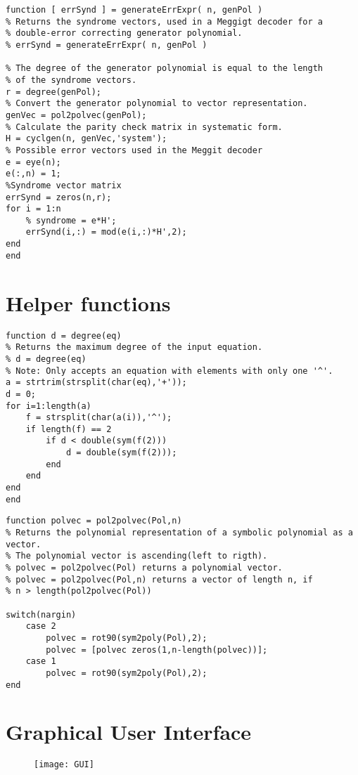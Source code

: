 \documentclass[MiniProjectMain]{subfiles}
\begin{document}
\begin{lstlisting}[caption= Generation of error syndrome vectors.]
function [ errSynd ] = generateErrExpr( n, genPol )
% Returns the syndrome vectors, used in a Meggigt decoder for a 
% double-error correcting generator polynomial.
% errSynd = generateErrExpr( n, genPol )

% The degree of the generator polynomial is equal to the length 
% of the syndrome vectors.
r = degree(genPol);
% Convert the generator polynomial to vector representation.
genVec = pol2polvec(genPol); 
% Calculate the parity check matrix in systematic form.
H = cyclgen(n, genVec,'system');
% Possible error vectors used in the Meggit decoder
e = eye(n);
e(:,n) = 1;
%Syndrome vector matrix
errSynd = zeros(n,r);
for i = 1:n
    % syndrome = e*H';
    errSynd(i,:) = mod(e(i,:)*H',2);
end
end
\end{lstlisting}

\section{Helper functions}
\begin{lstlisting}[caption=Maximum degree of polynomial]
function d = degree(eq)
% Returns the maximum degree of the input equation.
% d = degree(eq)
% Note: Only accepts an equation with elements with only one '^'.
a = strtrim(strsplit(char(eq),'+'));
d = 0;
for i=1:length(a)
    f = strsplit(char(a(i)),'^');
    if length(f) == 2
        if d < double(sym(f(2)))
            d = double(sym(f(2)));
        end
    end
end
end
\end{lstlisting}


\begin{lstlisting}[caption=Convert polynomial to vector form.]
function polvec = pol2polvec(Pol,n)
% Returns the polynomial representation of a symbolic polynomial as a vector.
% The polynomial vector is ascending(left to rigth).
% polvec = pol2polvec(Pol) returns a polynomial vector.
% polvec = pol2polvec(Pol,n) returns a vector of length n, if
% n > length(pol2polvec(Pol))

switch(nargin)
    case 2
        polvec = rot90(sym2poly(Pol),2);
        polvec = [polvec zeros(1,n-length(polvec))];
    case 1
        polvec = rot90(sym2poly(Pol),2);
end
\end{lstlisting}

\section{Graphical User Interface}

\begin{figure}[H]
\begin{center}
\texttt{[image: GUI]}
\end{center}
\end{figure}
\end{document}
